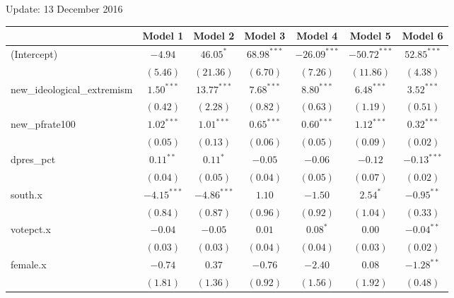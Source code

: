 \documentclass[12pt]{article}
\begin{document}
	
	\begin{center}
		Update: 13 December 2016
	\end{center}

\begin{table}
	\begin{center}
		\begin{tabular}{l c c c c c c }
			\hline
			& Model 1 & Model 2 & Model 3 & Model 4 & Model 5 & Model 6 \\
			\hline
			(Intercept)                 & $-4.94$       & $46.05^{*}$   & $68.98^{***}$ & $-26.09^{***}$ & $-50.72^{***}$ & $52.85^{***}$ \\
			& $(5.46)$      & $(21.36)$     & $(6.70)$      & $(7.26)$       & $(11.86)$      & $(4.38)$      \\
			new\_ideological\_extremism & $1.50^{***}$  & $13.77^{***}$ & $7.68^{***}$  & $8.80^{***}$   & $6.48^{***}$   & $3.52^{***}$  \\
			& $(0.42)$      & $(2.28)$      & $(0.82)$      & $(0.63)$       & $(1.19)$       & $(0.51)$      \\
			new\_pfrate100              & $1.02^{***}$  & $1.01^{***}$  & $0.65^{***}$  & $0.60^{***}$   & $1.12^{***}$   & $0.32^{***}$  \\
			& $(0.05)$      & $(0.13)$      & $(0.06)$      & $(0.05)$       & $(0.09)$       & $(0.02)$      \\
			dpres\_pct                  & $0.11^{**}$   & $0.11^{*}$    & $-0.05$       & $-0.06$        & $-0.12$        & $-0.13^{***}$ \\
			& $(0.04)$      & $(0.05)$      & $(0.04)$      & $(0.05)$       & $(0.07)$       & $(0.02)$      \\
			south.x                     & $-4.15^{***}$ & $-4.86^{***}$ & $1.10$        & $-1.50$        & $2.54^{*}$     & $-0.95^{**}$  \\
			& $(0.84)$      & $(0.87)$      & $(0.96)$      & $(0.92)$       & $(1.04)$       & $(0.33)$      \\
			votepct.x                   & $-0.04$       & $-0.05$       & $0.01$        & $0.08^{*}$     & $0.00$         & $-0.04^{**}$  \\
			& $(0.03)$      & $(0.03)$      & $(0.04)$      & $(0.04)$       & $(0.03)$       & $(0.02)$      \\
			female.x                    & $-0.74$       & $0.37$        & $-0.76$       & $-2.40$        & $0.08$         & $-1.28^{**}$  \\
			& $(1.81)$      & $(1.36)$      & $(0.92)$      & $(1.56)$       & $(1.92)$       & $(0.48)$      \\

\end{tabular}
\end{center}
\end{table}
\end{document}
